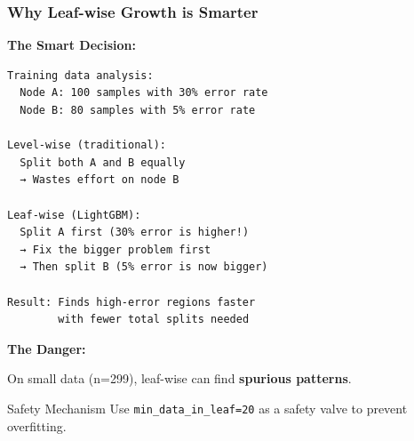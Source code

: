 \documentclass{beamer}
\begin{document}
\begin{frame}[fragile]
\frametitle{Why Leaf-wise Growth is Smarter}

\textbf{The Smart Decision:}

\vspace{0.2cm}
{\small
\begin{lstlisting}
Training data analysis:
  Node A: 100 samples with 30% error rate
  Node B: 80 samples with 5% error rate

Level-wise (traditional):
  Split both A and B equally
  → Wastes effort on node B

Leaf-wise (LightGBM):
  Split A first (30% error is higher!)
  → Fix the bigger problem first
  → Then split B (5% error is now bigger)

Result: Finds high-error regions faster
        with fewer total splits needed
\end{lstlisting}
}

\vspace{0.3cm}
\textbf{The Danger:}

On small data (n=299), leaf-wise can find \textbf{spurious patterns}.

\vspace{0.2cm}
\begin{alertblock}{Safety Mechanism}
Use \texttt{min\_data\_in\_leaf=20} as a safety valve to prevent overfitting.
\end{alertblock}

\end{frame}
\end{document}
